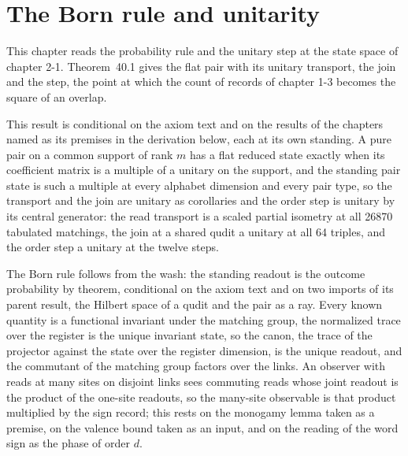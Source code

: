 \section{The Born rule and unitarity}\label{mod:II-2-born-rule-and-unitarity}
\label{narr:open:2-2}This chapter reads the probability rule and the unitary step at the state space of chapter 2-1. Theorem~40.1 gives the flat pair with its unitary transport, the join and the step, the point at which the count of records of chapter 1-3 becomes the square of an overlap.
\begin{chconditional}\label{box:II-2-born-rule-and-unitarity:1}
This result is conditional on the axiom text and on the results of the chapters named as its premises in the derivation below, each at its own standing.
A pure pair on a common support of rank $m$ has a flat reduced state exactly when its coefficient matrix is a multiple of a unitary on the support, and the standing pair state is such a multiple at every alphabet dimension and every pair type, so the transport and the join are unitary as corollaries and the order step is unitary by its central generator: the read transport is a scaled partial isometry at all 26870 tabulated matchings, the join at a shared qudit a unitary at all 64 triples, and the order step a unitary at the twelve steps.
\end{chconditional}
The Born rule follows from the wash: the standing readout is the outcome probability by theorem, conditional on the axiom text and on two imports of its parent result, the Hilbert space of a qudit and the pair as a ray.
Every known quantity is a functional invariant under the matching group, the normalized trace over the register is the unique invariant state, so the canon, the trace of the projector against the state over the register dimension, is the unique readout, and the commutant of the matching group factors over the links.
An observer with reads at many sites on disjoint links sees commuting reads whose joint readout is the product of the one-site readouts, so the many-site observable is that product multiplied by the sign record; this rests on the monogamy lemma taken as a premise, on the valence bound taken as an input, and on the reading of the word sign as the phase of order $d$.
